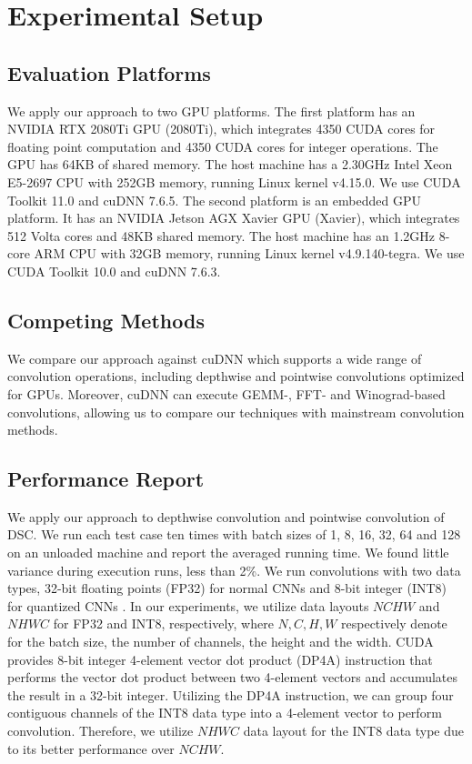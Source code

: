 

\section{Experimental Setup}

\subsection{Evaluation Platforms} We apply our approach to two GPU platforms.
The first platform has an NVIDIA RTX 2080Ti GPU (2080Ti), which integrates 4350 CUDA cores for floating point computation and 4350 CUDA
cores for integer operations. The GPU has 64KB of shared memory. The host machine has a 2.30GHz Intel Xeon E5-2697 CPU with 252GB memory,
running Linux kernel v4.15.0. We use CUDA Toolkit 11.0 and cuDNN 7.6.5. The second platform is an embedded GPU platform. It has an NVIDIA
Jetson AGX Xavier GPU (Xavier), which integrates 512 Volta cores and 48KB shared memory. The host machine has an 1.2GHz 8-core ARM CPU with
32GB memory, running Linux kernel v4.9.140-tegra. We use CUDA Toolkit 10.0 and cuDNN 7.6.3.


\subsection{Competing Methods} We compare our approach against cuDNN \cite{ChetlurWVCTCS14} which supports a wide range of convolution operations,
 including depthwise and pointwise convolutions optimized for GPUs.  Moreover, cuDNN can execute GEMM-, FFT- and Winograd-based convolutions, allowing
 us to compare our techniques with mainstream convolution methods.



\subsection{Performance Report}
We apply our approach to depthwise convolution and pointwise convolution of DSC.  We run each test case ten times with batch sizes of 1, 8,
16, 32, 64 and 128 on an unloaded machine and report the averaged running time. We found little variance during execution runs, less than
2\%. We run convolutions with two data types, 32-bit floating points (FP32) for normal CNNs and 8-bit integer (INT8) for quantized CNNs
\cite{nagel2019data}. In our experiments, we utilize data layouts $NCHW$ and $NHWC$ for FP32 and INT8, respectively, where $N, C, H, W$
respectively denote for the batch size, the number of channels, the height and the width. CUDA \cite{cudatoolkit} provides 8-bit integer
4-element vector dot product (DP4A) instruction that performs the vector dot product between two 4-element vectors and accumulates the
result in a 32-bit integer. Utilizing the DP4A instruction, we can group four contiguous channels of the INT8 data type into a 4-element
vector to perform convolution. Therefore, we utilize $NHWC$ data layout for the INT8 data type due to its better performance over $NCHW$.

